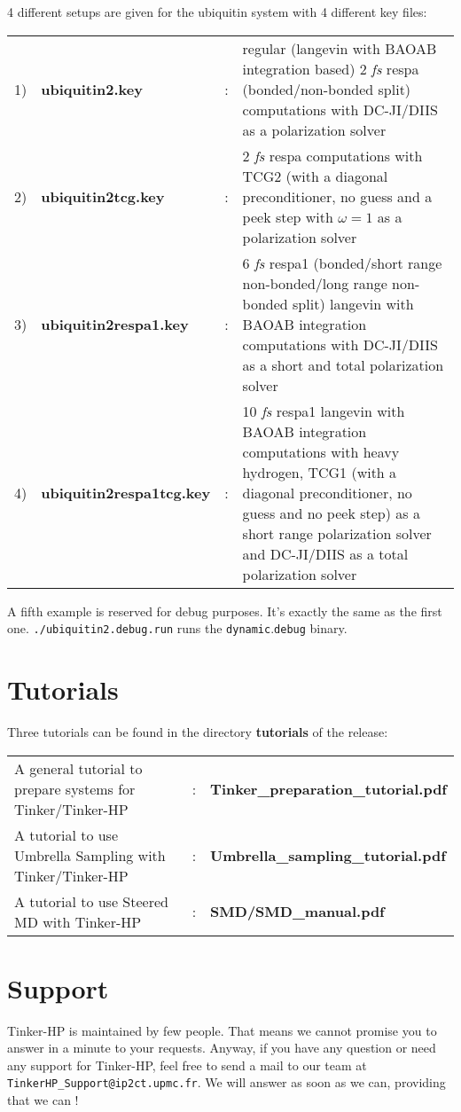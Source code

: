 \documentclass[peerreview]{IEEEtran}
\def\dynamic{\texttt{dynamic}}
\begin{document}
4 different setups are given for the ubiquitin system with 4 different key files:

\begin{tabular}{lllp{13.3cm}}
1)&\textbf{ubiquitin2.key}& : &regular (langevin with BAOAB integration based) 2 {\em fs} respa (bonded/non-bonded split) computations with DC-JI/DIIS as a polarization solver \\
2)&\textbf{ubiquitin2tcg.key}& : &2 {\em fs} respa computations with TCG2 (with a diagonal preconditioner, no guess and a peek step with $\omega=1$ as a polarization solver\\
3)&\textbf{ubiquitin2respa1.key}& : &6 {\em fs} respa1 (bonded/short range non-bonded/long range non-bonded split) langevin with BAOAB integration computations with DC-JI/DIIS as a short and total polarization solver\\
4)&\textbf{ubiquitin2respa1tcg.key}& : &10 {\em fs} respa1 langevin with BAOAB integration computations with heavy hydrogen, TCG1 (with a diagonal preconditioner, no guess and no peek step) as a short range polarization solver and DC-JI/DIIS as a total polarization solver\\
\end{tabular}

A fifth example is reserved for debug purposes. It's exactly the same as the first one. \texttt{./ubiquitin2.debug.run} runs the \dynamic.\texttt{debug} binary. 


\section{Tutorials}
Three tutorials can be found in the directory \textbf{tutorials} of the release:

\begin{tabular}[t]{lcl}
    A general tutorial to prepare systems for Tinker/Tinker-HP&:& \textbf{Tinker\_preparation\_tutorial.pdf}\\
     A tutorial to use Umbrella Sampling with Tinker/Tinker-HP&:& \textbf{Umbrella\_sampling\_tutorial.pdf}\\
    A tutorial to use Steered MD with Tinker-HP&:& \textbf{SMD/SMD\_manual.pdf}\\
\end{tabular}

\section{Support}

Tinker-HP is maintained by few people. That means we cannot promise you to answer in a minute to your requests. Anyway, if you have any question or need any support for Tinker-HP, feel free to send a mail to our team at \texttt{TinkerHP\_Support@ip2ct.upmc.fr}. We will answer as soon as we can, providing that we can ! 
\end{document}
